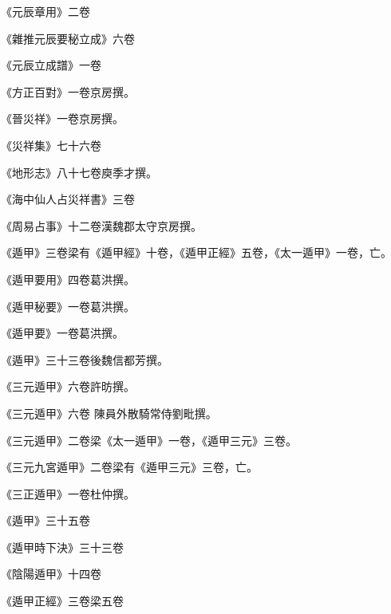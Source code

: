 \begin{pinyinscope}
 《元辰章用》二卷



 《雜推元辰要秘立成》六卷



 《元辰立成譜》一卷



 《方正百對》一卷京房撰。



 《晉災祥》一卷京房撰。



 《災祥集》七十六卷



 《地形志》八十七卷庾季才撰。



 《海中仙人占災祥書》三卷



 《周易占事》十二卷漢魏郡太守京房撰。



 《遁甲》三卷梁有《遁甲經》十卷，《遁甲正經》五卷，《太一遁甲》一卷，亡。



 《遁甲要用》四卷葛洪撰。



 《遁甲秘要》一卷葛洪撰。



 《遁甲要》一卷葛洪撰。



 《遁甲》三十三卷後魏信都芳撰。



 《三元遁甲》六卷許昉撰。



 《三元遁甲》六卷
 陳員外散騎常侍劉毗撰。



 《三元遁甲》二卷梁《太一遁甲》一卷，《遁甲三元》三卷。



 《三元九宮遁甲》二卷梁有《遁甲三元》三卷，亡。



 《三正遁甲》一卷杜仲撰。



 《遁甲》三十五卷



 《遁甲時下決》三十三卷



 《陰陽遁甲》十四卷



 《遁甲正經》三卷梁五卷




\end{pinyinscope}
